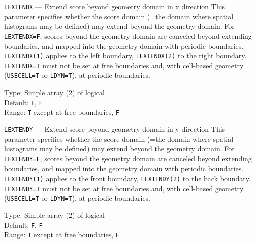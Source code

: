 \begin{keydescription}{\texttt{LEXTENDX} --- Extend score beyond geometry domain in x direction}
%
  This parameter specifies whether the score domain (=the domain where spatial histograms
  may be defined) may extend beyond the geometry domain. For \texttt{LEXTENDX=F}, scores beyond
  the geometry domain are canceled beyond extending boundaries, and mapped into the geometry
  domain with periodic boundaries. \texttt{LEXTENDX(1)} applies to the
  left boundary, \texttt{LEXTENDX(2)} to the right boundary. \texttt{LEXTENDX=T} must not be
  set at free boundaries and, with cell-based geometry (\texttt{USECELL=T} or \texttt{LDYN=T}),
  at periodic boundaries. 
  \begin{keytab}
    Type:    \> Simple array (2) of logical \\
    Default: \> \texttt{F}, \texttt{F} \\
    Range:   \> \texttt{T} except at free boundaries, \texttt{F} 
  \end{keytab}
\end{keydescription}

\begin{keydescription}{\texttt{LEXTENDY} --- Extend score beyond geometry domain in y direction}
%
  This parameter specifies whether the score domain (=the domain where spatial histograms
  may be defined) may extend beyond the geometry domain. For \texttt{LEXTENDY=F}, scores beyond
  the geometry domain are canceled beyond extending boundaries, and mapped into the geometry
  domain with periodic boundaries. \texttt{LEXTENDY(1)} applies to the
  front boundary, \texttt{LEXTENDY(2)} to the back boundary. \texttt{LEXTENDY=T} must not be
  set at free boundaries and, with cell-based geometry (\texttt{USECELL=T} or \texttt{LDYN=T}),
  at periodic boundaries. 
  \begin{keytab}
    Type:    \> Simple array (2) of logical \\
    Default: \> \texttt{F}, \texttt{F} \\
    Range:   \> \texttt{T} except at free boundaries, \texttt{F} 
  \end{keytab}
\end{keydescription}

